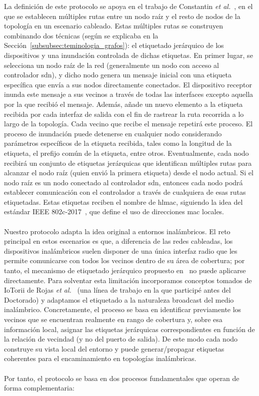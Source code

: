 La definición de este protocolo se apoya en el trabajo de Constantin \textit{et al.}~\cite{constantin2020desarrollo}, en el que se establecen múltiples rutas entre un nodo raíz y el resto de nodos de la topología en un escenario cableado. Estas múltiples rutas se construyen combinando dos técnicas (según se explicaba en la Sección~\ref{subsubsec:teminologia_grafos}): el etiquetado jerárquico de los dispositivos y una inundación controlada de dichas etiquetas. En primer lugar, se selecciona un nodo raíz de la red (generalmente un nodo con acceso al controlador \gls{sdn}), y dicho nodo genera un mensaje inicial con una etiqueta específica que envía a sus nodos directamente conectados. El dispositivo receptor inunda este mensaje a sus vecinos a través de todas las interfaces excepto aquella por la que recibió el mensaje. Además, añade un nuevo elemento a la etiqueta recibida por cada interfaz de salida con el fin de rastrear la ruta recorrida a lo largo de la topología. Cada vecino que recibe el mensaje repetirá este proceso. El proceso de inundación puede detenerse en cualquier nodo considerando parámetros específicos de la etiqueta recibida, tales como la longitud de la etiqueta, el prefijo común de la etiqueta, entre otros. Eventualmente, cada nodo recibirá un conjunto de etiquetas jerárquicas que identifican múltiples rutas para alcanzar el nodo raíz (quien envió la primera etiqueta) desde el nodo actual. Si el nodo raíz es un nodo conectado al controlador \gls{sdn}, entonces cada nodo podrá establecer comunicación con el controlador a través de cualquiera de esas rutas etiquetadas. Estas etiquetas reciben el nombre de \gls{hlmac}, siguiendo la idea del estándar IEEE 802c-2017~\cite{ieee802c2017}, que define el uso de direcciones \gls{mac} locales. \\
\\
Nuestro protocolo adapta la idea original a entornos inalámbricos. El reto principal en estos escenarios es que, a diferencia de las redes cableadas, los dispositivos inalámbricos suelen disponer de una única interfaz radio que les permite comunicarse con todos los vecinos dentro de su área de cobertura; por tanto, el mecanismo de etiquetado jerárquico propuesto en~\cite{constantin2020desarrollo} no puede aplicarse directamente. Para solventar esta limitación incorporamos conceptos tomados de IoTorii de Rojas \textit{et al.}~\cite{rojas2021outperforming} (una línea de trabajo en la que participé antes del Doctorado) y adaptamos el etiquetado a la naturaleza broadcast del medio inalámbrico. Concretamente, el proceso se basa en identificar previamente los vecinos que se encuentran realmente en rango de cobertura y, sobre esa información local, asignar las etiquetas jerárquicas correspondientes en función de la relación de vecindad (y no del puerto de salida). De este modo cada nodo construye su vista local del entorno y puede generar/propagar etiquetas coherentes para el encaminamiento en topologías inalámbricas. \\
\\
Por tanto, el protocolo se basa en dos procesos fundamentales que operan de forma complementaria:

